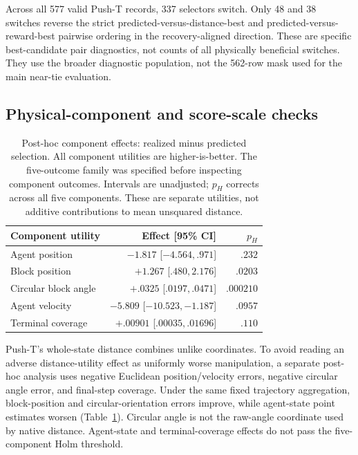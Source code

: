 \documentclass{article}
\begin{document}
Across all 577 valid Push-T records, 337 selectors switch. Only 48
and 38 switches reverse the strict predicted-versus-distance-best and
predicted-versus-reward-best pairwise ordering in the recovery-aligned direction.
These are specific best-candidate pair diagnostics, not counts of all
physically beneficial switches. They use the broader diagnostic population,
not the 562-row mask used for the main near-tie evaluation.

\subsection{Physical-component and score-scale checks}

\begin{table}[t]
\centering\small
\caption{Post-hoc component effects: realized minus predicted selection.
All component utilities are higher-is-better. The
five-outcome family was specified before inspecting component outcomes.
Intervals are unadjusted; $p_H$ corrects across all five components. These
are separate utilities, not additive contributions to mean unsquared distance.}
\label{tab:components}
\begin{tabular}{lrr}
\toprule
Component utility & Effect [95\% CI] & $p_H$ \\
\midrule
Agent position & $-1.817$ [$-4.564,.971$] & $.232$ \\
Block position & $+1.267$ [$.480,2.176$] & $.0203$ \\
Circular block angle & $+.0325$ [$.0197,.0471$] & $.000210$ \\
Agent velocity & $-5.809$ [$-10.523,-1.187$] & $.0957$ \\
Terminal coverage & $+.00901$ [$.00035,.01696$] & $.110$ \\
\bottomrule
\end{tabular}
\end{table}

Push-T's whole-state distance combines unlike coordinates. To avoid reading an
adverse distance-utility effect as uniformly worse manipulation, a separate post-hoc analysis uses
negative Euclidean position/velocity errors, negative circular angle error,
and final-step coverage. Under the same fixed trajectory aggregation,
block-position and circular-orientation errors improve, while agent-state
point estimates worsen (Table~\ref{tab:components}). Circular angle is not
the raw-angle coordinate used by native distance. Agent-state and terminal-coverage effects
do not pass the five-component Holm threshold.
\end{document}
